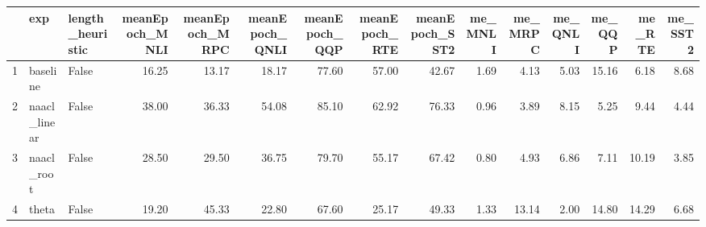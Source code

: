 \begin{table}[ht]
\centering
\begin{tabular}{rllrrrrrrrrrrrr}
  \hline
 & exp & length\_heuristic & meanEpoch\_MNLI & meanEpoch\_MRPC & meanEpoch\_QNLI & meanEpoch\_QQP & meanEpoch\_RTE & meanEpoch\_SST2 & me\_MNLI & me\_MRPC & me\_QNLI & me\_QQP & me\_RTE & me\_SST2 \\ 
  \hline
1 & baseline & False & 16.25 & 13.17 & 18.17 & 77.60 & 57.00 & 42.67 & 1.69 & 4.13 & 5.03 & 15.16 & 6.18 & 8.68 \\ 
  2 & naacl\_linear & False & 38.00 & 36.33 & 54.08 & 85.10 & 62.92 & 76.33 & 0.96 & 3.89 & 8.15 & 5.25 & 9.44 & 4.44 \\ 
  3 & naacl\_root & False & 28.50 & 29.50 & 36.75 & 79.70 & 55.17 & 67.42 & 0.80 & 4.93 & 6.86 & 7.11 & 10.19 & 3.85 \\ 
  4 & theta & False & 19.20 & 45.33 & 22.80 & 67.60 & 25.17 & 49.33 & 1.33 & 13.14 & 2.00 & 14.80 & 14.29 & 6.68 \\ 
   \hline
\end{tabular}
\end{table}
